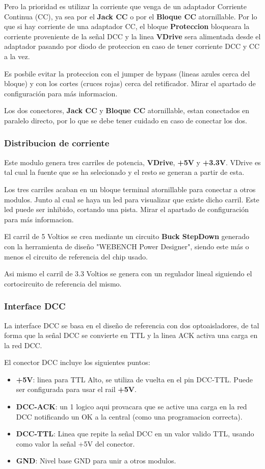 Pero la prioridad es utilizar la corriente que venga de un adaptador Corriente Continua (CC), 
ya sea por el \textbf{Jack CC} o por el \textbf{Bloque CC} atornillable. 
Por lo que si hay corriente de una adaptador CC, el bloque \textbf{Proteccion} bloqueara la corriente
proveniente de la señal DCC y la linea \textbf{VDrive} sera alimentada desde el adaptador
pasando por diodo de proteccion en caso de tener corriente DCC y CC a la vez.

Es posbile evitar la proteccion con el jumper de bypass (lineas azules cerca del bloque) y
con los cortes (cruces rojas) cerca del retificador. Mirar el apartado de configuración para
más informacion.

Los dos conectores, \textbf{Jack CC} y \textbf{Bloque CC} atornillable, estan conectados
en paralelo directo, por lo que se debe tener cuidado en caso de conectar los dos.

\subsubsection{Distribucion de corriente}
Este modulo genera tres carriles de potencia, \textbf{VDrive}, \textbf{+5V} y \textbf{+3.3V}.
VDrive es tal cual la fuente que se ha selecionado y el resto se generan a partir de esta.

Los tres carriles acaban en un bloque terminal atornillable para conectar a otros modulos.
Junto al cual se haya un led para visualizar que existe dicho carril. Este led puede ser
inhibido, cortando una pista. Mirar el apartado de configuración para
más informacion.

El carril de 5 Voltios se crea mediante un circuito \textbf{Buck StepDown} generado con la herramienta
de diseño "WEBENCH Power Designer", siendo este más o menos el circuito de referencia del chip usado.

Asi mismo el carril de 3.3 Voltios se genera con un regulador lineal siguiendo el cortocircuito
de referencia del mismo.

\subsubsection{Interface DCC}
La interface DCC se basa en el diseño de referencia con dos optoaisladores, de tal forma que la
señal DCC se convierte en TTL y la linea ACK activa una carga en la red DCC.

El conector DCC incluye los siguientes puntos:
\begin{itemize}
    \item \textbf{+5V}: linea para TTL Alto, se utiliza de vuelta en el pin DCC-TTL. Puede ser configurada
para usar el rail \textbf{+5V}.
    \item \textbf{DCC-ACK}: un 1 logico aqui provacara que se active una carga en la red DCC
notificando un OK a la central (como una programacion correcta).
    \item \textbf{DCC-TTL}: Linea que repite la señal DCC en un valor valido TTL, usando como valor
la señal +5V del conector.
    \item \textbf{GND}: Nivel base GND para unir a otros modulos.
\end{itemize} 

